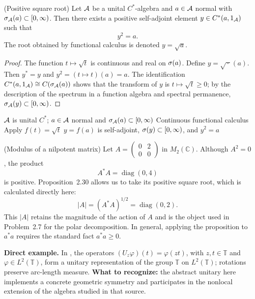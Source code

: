 \begin{cthproposicion}{(Positive square root)}
Let $\mathcal A$ be a unital $C^*$-algebra and $a\in\mathcal A$ normal with
$\sigma_\mathcal A(a)\subset[0,\infty)$. Then there exists a positive self-adjoint
element $y\in C^*(a,1_\mathcal A)$ such that
\[
 y^2=a.
\]
The root obtained by functional calculus is denoted $y=\sqrt a$.
\end{cthproposicion}

\begin{proof}[Proof]
The function $t\mapsto\sqrt t$ is continuous and real on $\sigma(a)$.
Define $y=\sqrt{\,\cdot\,}(a)$. Then $y^*=y$ and
$y^2=(t\mapsto t)(a)=a$.
The identification $C^*(a,1_\mathcal A)\cong C(\sigma_\mathcal A(a))$ shows that the
transform of $y$ is $t\mapsto\sqrt t\ge0$; by the description of the
spectrum in a function algebra and spectral permanence,
$\sigma_\mathcal A(y)\subset[0,\infty)$.
\end{proof}

\proofdiagram
{$\mathcal A$ is unital $C^*$; $a\in\mathcal A$ normal and $\sigma_\mathcal A(a)\subset[0,\infty)$}
{Continuous functional calculus}
{Apply $f(t)=\sqrt t$}
{$y=f(a)$ is self-adjoint, $\sigma(y)\subset[0,\infty)$, and $y^2=a$}

\begin{cthejemplo}{(Modulus of a nilpotent matrix)}
Let $A=\begin{pmatrix}0&2\\0&0\end{pmatrix}$ in $M_2(\mathbb C)$.
Although $A^2=0$, the product
\[
 A^*A=\operatorname{diag}(0,4)
\]
is positive. Proposition~2.30 allows us to take its positive square root,
which is calculated directly here:
\[
 |A|=(A^*A)^{1/2}=\operatorname{diag}(0,2).
\]
This $|A|$ retains the magnitude of the action of $A$ and is the object used
in Problem~2.7 for the polar decomposition. In general, applying the
proposition to $a^*a$ requires the standard fact $a^*a\ge0$.
\end{cthejemplo}

\begin{investigacion}
\textbf{Direct example.} In \cite[Sec.~1, p.~20]{BFK2006}, the operators
$(U_z\varphi)(t)=\varphi(zt)$, with $z,t\in\mathbb T$ and
$\varphi\in L^2(\mathbb T)$, form a unitary representation of the group
$\mathbb T$ on $L^2(\mathbb T)$; rotations preserve arc-length measure.
\textbf{What to recognize:} the abstract unitary here implements a concrete
geometric symmetry and participates in the nonlocal extension of the algebra
studied in that source.
\end{investigacion}

